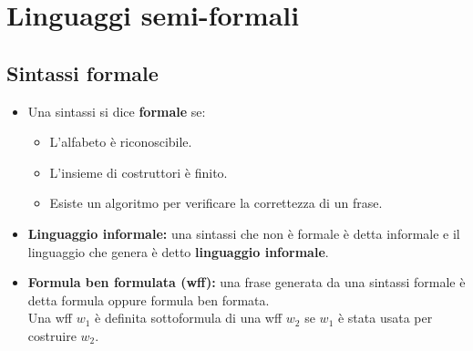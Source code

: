 \documentclass{book}
\begin{document}
    \section{Linguaggi semi-formali}

    \subsection{Sintassi formale}
    \begin{itemize}
        \item Una sintassi si dice \textbf{formale} se:
        \begin{itemize}
            \item L'alfabeto è riconoscibile.
            \item L'insieme di costruttori è finito.
            \item Esiste un algoritmo per verificare la correttezza di un frase.
        \end{itemize}
        \item \textbf{Linguaggio informale:} una sintassi che non è formale è detta informale e il linguaggio che genera è detto \textbf{linguaggio informale}.
        \item \textbf{Formula ben formulata (wff):} una frase generata da una sintassi formale è detta formula oppure formula ben formata.\\
            Una wff $w_1$ è definita sottoformula di una wff $w_2$ se $w_1$ è stata usata per costruire $w_2$.
    \end{itemize}
\end{document}
